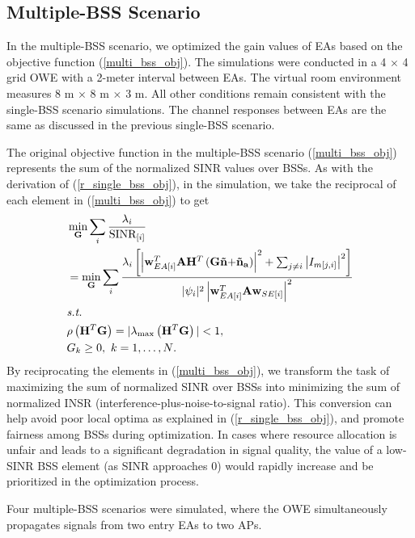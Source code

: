 \subsection{Multiple-BSS Scenario}
In the multiple-BSS scenario, we optimized the gain values of EAs based on the objective function (\ref{multi_bss_obj}).
The simulations were conducted in a 4 $\times$ 4 grid OWE with a 2-meter interval between EAs. The virtual room environment measures 8 m $\times$ 8 m $\times$ 3 m. All other conditions remain consistent with the single-BSS scenario simulations.
The channel responses between EAs are the same as discussed in the previous single-BSS scenario. 
\par
The original objective function in the multiple-BSS scenario (\ref{multi_bss_obj}) represents the sum of the normalized SINR values over BSSs.
As with the derivation of (\ref{r_single_bss_obj}), in the simulation, we take the reciprocal of each element in (\ref{multi_bss_obj}) to get
\begin{align}
\label{r_multi_bss_obj}
&\min_\mathbf{G} \sum_i \frac{\lambda_i}{\text{SINR}_{[i]}} \\
& = \min_\mathbf{G} \sum_i
\frac{\lambda_i\left[{{{\left| {\mathbf{w}_{EA[i]}^T\mathbf{A}{\mathbf{H}^T}\left( {\mathbf{G\tilde n + }{{\mathbf{\tilde n}}_\mathbf{a}}} \right)} \right|}^2}} + \sum_{j\neq i}\left|I_{m[j,i]}\right|^2\right]}{{{{|\psi_i|^2\left|\mathbf{w}_{EA[i]}^T\mathbf{A}{\mathbf{w}_{SE[i]}} \right|}^2}}} \notag \\
&\textit{s.t.} \notag \\
& \rho\left({\mathbf{H}^T}\mathbf{G}\right)=|\lambda_{\max}\left({\mathbf{H}^T}\mathbf{G}\right)|<1, \notag \\
& G_k\geq0,{\ }k=1,\dots, N \text{.} \notag
\end{align}
By reciprocating the elements in (\ref{multi_bss_obj}), we transform the task of maximizing the sum of normalized SINR over BSSs into minimizing the sum of normalized INSR (interference-plus-noise-to-signal ratio). This conversion can help avoid poor local optima as explained in (\ref{r_single_bss_obj}), and promote fairness among BSSs during optimization. In cases where resource allocation is unfair and leads to a significant degradation in signal quality, the value of a low-SINR BSS element (as SINR approaches 0) would rapidly increase and be prioritized in the optimization process.
\par
Four multiple-BSS scenarios were simulated, where the OWE simultaneously propagates signals from two entry EAs to two APs.
